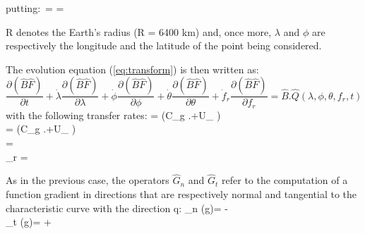 \bequ
\label{eq:GrindEQ__4_23}
\mbox{putting: }= =  
\eequ

 R denotes the Earth's radius (R = 6400 km) and, once more, $\lambda$ and $\phi$ are respectively the longitude and the latitude of the point being considered.

 The evolution equation (\ref{eq:transform}) is then written as:
\begin{equation} \label{GrindEQ__4_24_}
\frac{\partial (\hat{B}\hat{F})}{\partial t} +\dot{\lambda }\frac{\partial (\hat{B}\hat{F})}{\partial \lambda } +\dot{\phi }\frac{\partial (\hat{B}\hat{F})}{\partial \phi } +\dot{\theta }\frac{\partial (\hat{B}\hat{F})}{\partial \theta } +\dot{f}_{r} \frac{\partial (\hat{B}\hat{F})}{\partial f_{r} } =\hat{B}.\hat{Q}(\lambda ,\phi ,\theta ,f_{r} ,t)
\end{equation}
with the following transfer rates:
\bequ
\label{eq:equ4_25}
\dsp \dot{\lambda }= \left(C_{g} .\sin \theta +U_{\lambda } \right) \\[6pt]
\dsp \dot{\phi}= \left(C_{g} .\cos \theta +U_{\phi } \right)\\[6pt]
\dsp \dot{\theta }= \\[6pt]
\dsp {}_{r} = 
\earr
\eequ

 As in the previous case, the operators $\hat{G}_{n} $ and $\hat{G}_{t} $ refer to the computation of a function gradient in directions that are respectively normal and tangential to the characteristic curve with the direction q:
\bequ
\label{eq:equ4_26}
\dsp {}_{n} (g)=\frac{\cos \theta }{\cos \phi } \;  \; -\sin \theta \; \\[6pt]
\dsp {}_{t} (g)=\frac{\sin \theta }{\cos \phi } \;  \; +\cos \theta \;  
\earr
\eequ

